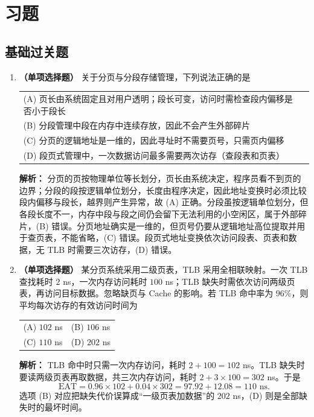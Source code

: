 \section{习题}

\subsection{基础过关题}

\begin{enumerate}

\item \textbf{（单项选择题）} 关于分页与分段存储管理，下列说法正确的是
\begin{center}
\begin{tabular}{ll}
(A) 页长由系统固定且对用户透明；段长可变，访问时需检查段内偏移是否小于段长 \\[4pt]
(B) 分段管理中段在内存中连续存放，因此不会产生外部碎片 \\[4pt]
(C) 分页的逻辑地址是一维的，因此寻址时不需要页号，只需页内偏移 \\[4pt]
(D) 段页式管理中，一次数据访问最多需要两次访存（查段表和页表）
\end{tabular}
\end{center}

\ifshowsolutions\par\noindent\textbf{解析：} 分页的页按物理单位等长划分，页长由系统决定，程序员看不到页的边界；分段的段按逻辑单位划分，长度由程序决定，因此地址变换时必须比较段内偏移与段长，越界则产生异常，故 (A) 正确。分段虽按逻辑单位划分，但各段长度不一，内存中段与段之间仍会留下无法利用的小空闲区，属于外部碎片，(B) 错误。分页地址确实是一维的，但页号仍要从逻辑地址高位提取并用于查页表，不能省略，(C) 错误。段页式地址变换依次访问段表、页表和数据，无 TLB 时需要三次访存，(D) 错误。\else \answerarea \fi

\item \textbf{（单项选择题）} 某分页系统采用二级页表，TLB 采用全相联映射。一次 TLB 查找耗时 $2$ ns，一次内存访问耗时 $100$ ns；TLB 缺失时需依次访问两级页表，再访问目标数据。忽略缺页与 Cache 的影响。若 TLB 命中率为 $96\%$，则平均每次访存的有效访问时间为
\begin{center}
\begin{tabular}{ll}
(A) $102$ ns & (B) $106$ ns \\[4pt]
(C) $110$ ns & (D) $202$ ns
\end{tabular}
\end{center}

\ifshowsolutions\par\noindent\textbf{解析：} TLB 命中时只需一次内存访问，耗时 $2+100=102$ ns。TLB 缺失时要读两级页表再取数据，共三次内存访问，耗时 $2+3\times100=302$ ns。于是
\[
\text{EAT}=0.96\times102+0.04\times302
=97.92+12.08=110\text{ ns}.
\]
选项 (B) 对应把缺失代价误算成“一级页表加数据”的 $202$ ns，(D) 则是全部缺失时的最坏时间。\else \answerarea \fi


\end{enumerate}
